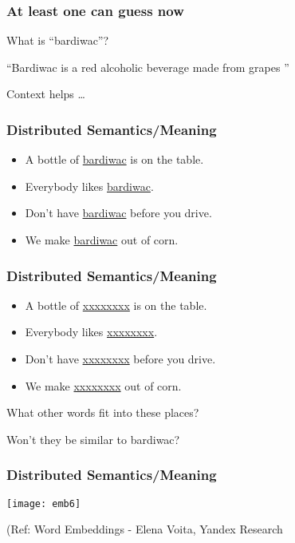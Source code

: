 \begin{frame}[fragile]\frametitle{At least one can guess now}
What is ``bardiwac''?

``Bardiwac is a red 
alcoholic beverage 
made from grapes ''

Context helps \ldots
\end{frame}

\begin{frame}[fragile]\frametitle{Distributed Semantics/Meaning}
\begin{itemize}
\item  A bottle of \underline{bardiwac} is on the table. 
\item  Everybody likes \underline{bardiwac}.
\item  Don’t have \underline{bardiwac} before you drive. 
\item  We make \underline{bardiwac}  out of corn. 

\end{itemize}
\end{frame}

\begin{frame}[fragile]\frametitle{Distributed Semantics/Meaning}
\begin{itemize}
\item  A bottle of \underline{xxxxxxxx} is on the table. 
\item  Everybody likes \underline{xxxxxxxx}.
\item  Don’t have \underline{xxxxxxxx} before you drive. 
\item  We make \underline{xxxxxxxx}  out of corn. 

\end{itemize}

What other words fit into these places? 

Won't they be similar to bardiwac?
\end{frame}

\begin{frame}[fragile]\frametitle{Distributed Semantics/Meaning}
\begin{center}
\texttt{[image: emb6]}
\end{center}

{\tiny (Ref: Word Embeddings - Elena Voita, Yandex Research}
\end{frame}



